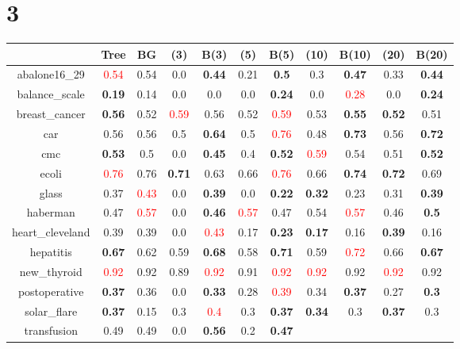 \documentclass{article}%
\begin{document}
\section*{3}%
\begin{tabular}{c|cccccccccc}%
\hline%
&Tree&BG&(3)&B(3)&(5)&B(5)&(10)&B(10)&(20)&B(20)\\%
\hline%
abalone16\_29&\textcolor{red}{ 
0.54
}&0.54&0.0&\textbf{0.44}&0.21&\textbf{0.5}&0.3&\textbf{0.47}&0.33&\textbf{0.44}\\%
\hline%
balance\_scale&\textbf{0.19}&0.14&0.0&0.0&0.0&\textbf{0.24}&0.0&\textcolor{red}{ 
0.28
}&0.0&\textbf{0.24}\\%
\hline%
breast\_cancer&\textbf{0.56}&0.52&\textcolor{red}{ 
0.59
}&0.56&0.52&\textcolor{red}{ 
0.59
}&0.53&\textbf{0.55}&\textbf{0.52}&0.51\\%
\hline%
car&0.56&0.56&0.5&\textbf{0.64}&0.5&\textcolor{red}{ 
0.76
}&0.48&\textbf{0.73}&0.56&\textbf{0.72}\\%
\hline%
cmc&\textbf{0.53}&0.5&0.0&\textbf{0.45}&0.4&\textbf{0.52}&\textcolor{red}{ 
0.59
}&0.54&0.51&\textbf{0.52}\\%
\hline%
ecoli&\textcolor{red}{ 
0.76
}&0.76&\textbf{0.71}&0.63&0.66&\textcolor{red}{ 
0.76
}&0.66&\textbf{0.74}&\textbf{0.72}&0.69\\%
\hline%
glass&0.37&\textcolor{red}{ 
0.43
}&0.0&\textbf{0.39}&0.0&\textbf{0.22}&\textbf{0.32}&0.23&0.31&\textbf{0.39}\\%
\hline%
haberman&0.47&\textcolor{red}{ 
0.57
}&0.0&\textbf{0.46}&\textcolor{red}{ 
0.57
}&0.47&0.54&\textcolor{red}{ 
0.57
}&0.46&\textbf{0.5}\\%
\hline%
heart\_cleveland&0.39&0.39&0.0&\textcolor{red}{ 
0.43
}&0.17&\textbf{0.23}&\textbf{0.17}&0.16&\textbf{0.39}&0.16\\%
\hline%
hepatitis&\textbf{0.67}&0.62&0.59&\textbf{0.68}&0.58&\textbf{0.71}&0.59&\textcolor{red}{ 
0.72
}&0.66&\textbf{0.67}\\%
\hline%
new\_thyroid&\textcolor{red}{ 
0.92
}&0.92&0.89&\textcolor{red}{ 
0.92
}&0.91&\textcolor{red}{ 
0.92
}&\textcolor{red}{ 
0.92
}&0.92&\textcolor{red}{ 
0.92
}&0.92\\%
\hline%
postoperative&\textbf{0.37}&0.36&0.0&\textbf{0.33}&0.28&\textcolor{red}{ 
0.39
}&0.34&\textbf{0.37}&0.27&\textbf{0.3}\\%
\hline%
solar\_flare&\textbf{0.37}&0.15&0.3&\textcolor{red}{ 
0.4
}&0.3&\textbf{0.37}&\textbf{0.34}&0.3&\textbf{0.37}&0.3\\%
\hline%
transfusion&0.49&0.49&0.0&\textbf{0.56}&0.2&\textbf{0.47}&\textcolor{red}{ 
}
\end{tabular}
\end{document}
